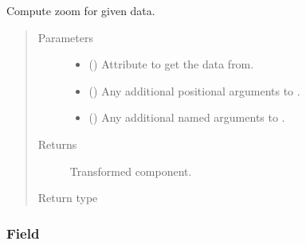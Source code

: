 \documentclass[letterpaper,10pt,english]{sphinxmanual}
\begin{document}
\begin{fulllineitems}
\begin{fulllineitems}
\label{\detokenize{api/base_classes:geology.src.base_spatial.SpatialComponent.zoom}}
Compute zoom for given data.
\begin{quote}\begin{description}
\item[{Parameters}] \leavevmode\begin{itemize}
\item {} 
 (\sphinxstyleliteralemphasis{\sphinxupquote{, }}) \textendash{} Attribute to get the data from.

\item {} 
 () \textendash{} Any additional positional arguments to .

\item {} 
 () \textendash{} Any additional named arguments to .

\end{itemize}

\item[{Returns}] \leavevmode
{} \textendash{} Transformed component.

\item[{Return type}] \leavevmode
{\hyperref[\detokenize{api/base_classes:geology.src.base_spatial.SpatialComponent}]{}}

\end{description}\end{quote}

\end{fulllineitems}


\end{fulllineitems}



\subsubsection{Field}
\label{\detokenize{api/field:field}}\label{\detokenize{api/field::doc}}
\end{document}
